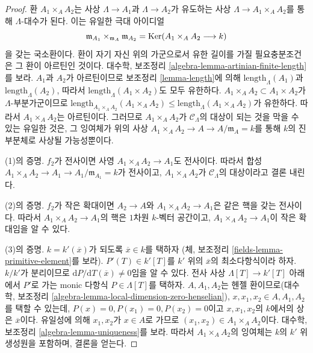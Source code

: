 \begin{proof}
환 $A_1 \times_A A_2$는 사상 $\Lambda \to A_1$과
$\Lambda \to A_2$가 유도하는 사상
$\Lambda \to A_1 \times_A A_2$를 통해 $\Lambda$-대수가 된다. 이는 유일한
극대 아이디얼
$$
\mathfrak m_{A_1} \times_{\mathfrak m_A} \mathfrak m_{A_2} =
\mathop{\mathrm{Ker}}(A_1 \times_A A_2 \longrightarrow k)
$$
을 갖는 국소환이다. 환이 자기 자신 위의 가군으로서 유한 길이를 가질
필요충분조건은 그 환이 아르틴인 것이다. 대수학, 보조정리
\ref{algebra-lemma-artinian-finite-length}를 보라.
$A_1$과 $A_2$가 아르틴이므로 보조정리 \ref{lemma-length}에 의해
$\text{length}_\Lambda(A_1)$과 $\text{length}_\Lambda(A_2)$,
따라서 $\text{length}_\Lambda(A_1 \times A_2)$도 모두 유한하다.
$A_1 \times_A A_2 \subset A_1 \times A_2$가 $\Lambda$-부분가군이므로
$\text{length}_{A_1 \times_A A_2}(A_1 \times_A A_2) \leq
\text{length}_\Lambda(A_1 \times_A A_2)$가 유한하다. 따라서
$A_1 \times_A A_2$는 아르틴이다. 그러므로
$A_1 \times_A A_2$가 $\mathcal{C}_\Lambda$의 대상이 되는 것을 막을 수 있는
유일한 것은, 그 잉여체가 위의 사상
$A_1 \times_A A_2 \to A \to A/\mathfrak m_A = k$를 통해 $k$의 진부분체로
사상될 가능성뿐이다.

\medskip\noindent
(1)의 증명. $f_2$가 전사이면 사영
$A_1 \times_A A_2 \to A_1$도 전사이다. 따라서 합성
$A_1 \times_A A_2 \to A_1 \to A_1/\mathfrak m_{A_1} = k$가 전사이고,
$A_1 \times_A A_2$가 $\mathcal{C}_\Lambda$의 대상이라고 결론 내린다.

\medskip\noindent
(2)의 증명. $f_2$가 작은 확대이면 $A_2 \to A$와
$A_1 \times_A A_2  \to A_1$은 같은 핵을 갖는 전사이다.
따라서 $A_1 \times_A A_2  \to A_1$의 핵은 $1$차원
$k$-벡터 공간이고, $A_1 \times_A A_2  \to A_1$이 작은 확대임을 알 수 있다.

\medskip\noindent
(3)의 증명. $k = k'(\overline{x})$가 되도록 $\overline{x} \in k$를 택하자
(체, 보조정리 \ref{fields-lemma-primitive-element}를 보라).
$P'(T) \in k'[T]$를 $k'$ 위의 $\overline{x}$의 최소다항식이라 하자.
$k/k'$가 분리이므로
$\text{d}P/\text{d}T(\overline{x}) \not = 0$임을 알 수 있다.
전사 사상 $\Lambda[T] \to k'[T]$ 아래에서 $P'$로 가는 monic 다항식
$P \in \Lambda[T]$를 택하자. $A, A_1, A_2$는 헨젤 환이므로(대수학,
보조정리 \ref{algebra-lemma-local-dimension-zero-henselian}),
$x, x_1, x_2 \in A, A_1, A_2$를 택할 수 있는데,
$P(x) = 0, P(x_1) = 0, P(x_2) = 0$이고 $x, x_1, x_2$의 $k$에서의 상은
$\overline{x}$이다. 유일성에 의해 $x_1, x_2$가 $x \in A$로 가므로
$(x_1, x_2) \in A_1 \times_A A_2$이다. 대수학, 보조정리
\ref{algebra-lemma-uniqueness}를 보라.
따라서 $A_1 \times_A A_2$의 잉여체는 $k$의 $k'$ 위 생성원을 포함하며,
결론을 얻는다.
\end{proof}

